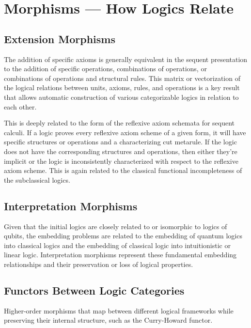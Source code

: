 
\chapter*{Morphisms --- How Logics Relate}

\section*{Extension Morphisms}
The addition of specific axioms is generally equivalent in the sequent presentation to the addition of specific operations, combinations of operations, or combinations of operations and structural rules. This matrix or vectorization of the logical relations between units, axioms, rules, and operations is a key result that allows automatic construction of various categorizable logics in relation to each other.

This is deeply related to the form of the reflexive axiom schemata for sequent calculi. If a logic proves every reflexive axiom scheme of a given form, it will have specific structures or operations and a characterizing cut metarule. If the logic does not have the corresponding structures and operations, then either they're implicit or the logic is inconsistently characterized with respect to the reflexive axiom scheme. This is again related to the classical functional incompleteness of the subclassical logics.

\section*{Interpretation Morphisms}
Given that the initial logics are closely related to or isomorphic to logics of qubits, the embedding problems are related to the embedding of quantum logics into classical logics and the embedding of classical logic into intuitionistic or linear logic. Interpretation morphisms represent these fundamental embedding relationships and their preservation or loss of logical properties.

\section*{Functors Between Logic Categories}
Higher-order morphisms that map between different logical frameworks while preserving their internal structure, such as the Curry-Howard functor.
